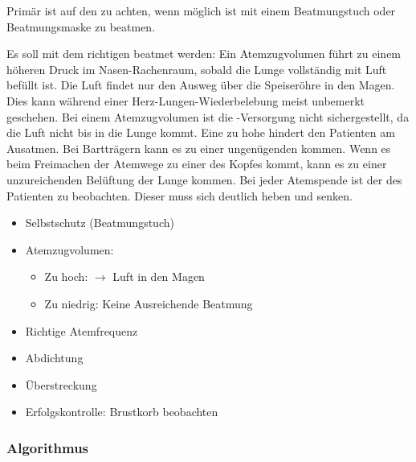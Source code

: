 {
Primär ist auf den  zu achten, wenn möglich
ist mit einem Beatmungstuch oder Beatmungsmaske zu beatmen.

Es soll mit dem richtigen  beatmet werden: 
%
Ein  Atemzugvolumen führt zu einem höheren
Druck im Nasen-Rachenraum, sobald die Lunge vollständig mit
Luft befüllt ist. Die Luft findet nur den Ausweg über die
Speiseröhre in den Magen. Dies kann während einer
Herz-Lungen-Wiederbelebung meist unbemerkt geschehen. Bei
einem  Atemzugvolumen ist die
-Versorgung nicht sichergestellt, da die Luft nicht
bis in die Lunge kommt. 
%
Eine zu hohe  hindert den Patienten am Ausatmen. 
%
Bei Bartträgern kann es zu einer
ungenügenden  kommen.
Wenn es
beim Freimachen der Atemwege zu einer  des Kopfes kommt, kann es zu einer
unzureichenden Belüftung der Lunge kommen. Bei jeder
Atemspende ist der  des Patienten zu
{beobachten}. Dieser muss sich deutlich heben und senken.

}{
\begin{itemize}
  \item Selbstschutz (Beatmungstuch)
  \item Atemzugvolumen:\begin{itemize}
    \item Zu hoch: ${\rightarrow}$ Luft in den Magen
  \item Zu niedrig: Keine Ausreichende Beatmung 
  \end{itemize}
  \item Richtige Atemfrequenz
  \item Abdichtung
  \item Überstreckung
  \item Erfolgskontrolle: Brustkorb beobachten 
\end{itemize}
}{}{}{}

\clearpage%

\subsubsection{Algorithmus }

